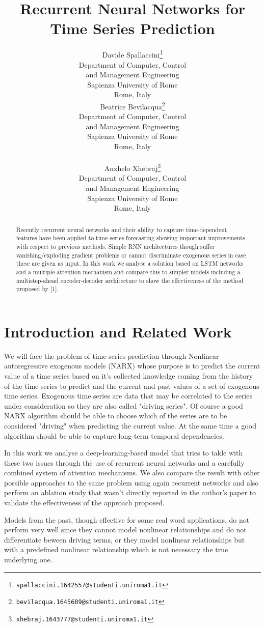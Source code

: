 \documentclass{article}
\title{Recurrent Neural Networks for Time Series Prediction}
\author{
  Davide Spallaccini\thanks{\texttt{spallaccini.1642557@studenti.uniroma1.it}}
\\
  Department of Computer, Control \\ and Management Engineering\\
  Sapienza University of Rome\\
  Rome, Italy \\
  \And
  Beatrice Bevilacqua\thanks{\texttt{bevilacqua.1645689@studenti.uniroma1.it}}
\\
  Department of Computer, Control \\ and Management Engineering\\
  Sapienza University of Rome\\
  Rome, Italy \\
   \\
  \And
  Anxhelo Xhebraj\thanks{\texttt{xhebraj.1643777@studenti.uniroma1.it}} \\
  Department of Computer, Control \\ and Management Engineering\\
  Sapienza University of Rome\\
  Rome, Italy
}
\begin{document}

\maketitle

\begin{abstract}

Recently recurrent neural networks and their ability to capture time-dependent 
features have been applied to time series forecasting showing important 
improvements with respect to  previous methods. Simple RNN architectures though
suffer vanishing/exploding gradient problems or cannot discriminate exogenous series in case these are given as input. In this work we analyse a solution based on LSTM networks and a multiple attention mechanism and compare this to simpler models including a multistep-ahead encoder-decoder architecture to show the effectiveness of the method proposed by [1].

\end{abstract}

\section{Introduction and Related Work}
\label{sec:intro}

We will face the problem of time series prediction through Nonlinear
autoregressive exogenous models (NARX) whose
purpose is to predict the current value of a time series based on it's
collected knowledge coming from the history of
the time series to predict and the current and past values of a set of
exogenous time series. Exogenous time series
are data that may be correlated to the series under consideration so they are
also called "driving series". Of course
a good NARX algorithm should be able to choose which of the series are to be
considered "driving" when predicting the
current value. At the same time a good algorithm should be able to capture
long-term temporal dependencies.

In this work we analyse a deep-learning-based model that tries to takle with
these two issues through the use of
recurrent neural networks and a carefully combined system of attention
mechanisms. We also compare the result with
other possible approaches to the same problem using again recurrent networks
and also perform an ablation study that
wasn't directly reported in the author's paper to validate the effectiveness of
the approach proposed.

Models from the past, though effective for some real word applications, do not
perform very well since they cannot
model nonlinear relationships and do not differentiate beween driving terms, or
they model nonlinear relationships
but with a predefined nonlinear relationship which is not necessary the true
underlying one.
\end{document}
